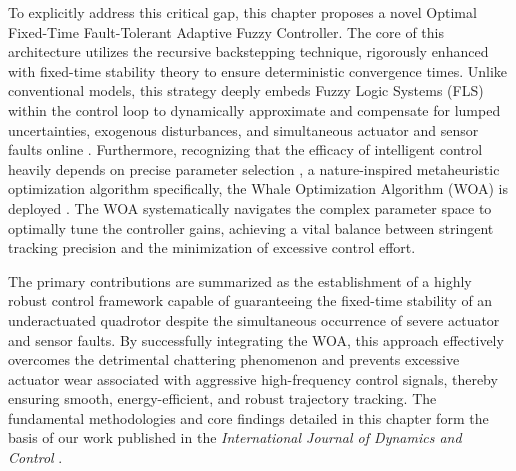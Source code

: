 To explicitly address this critical gap, this chapter proposes a novel Optimal Fixed-Time Fault-Tolerant Adaptive Fuzzy Controller. The core of this architecture utilizes the recursive backstepping technique, rigorously enhanced with fixed-time stability theory to ensure deterministic convergence times. Unlike conventional models, this strategy deeply embeds Fuzzy Logic Systems (FLS) within the control loop to dynamically approximate and compensate for lumped uncertainties, exogenous disturbances, and simultaneous actuator and sensor faults online \cite{Wang1994}. Furthermore, recognizing that the efficacy of intelligent control heavily depends on precise parameter selection \cite{MFC1, glida2019bat, glida2020pso}, a nature-inspired metaheuristic optimization algorithm specifically, the Whale Optimization Algorithm (WOA) is deployed \cite{woa}. The WOA systematically navigates the complex parameter space to optimally tune the controller gains, achieving a vital balance between stringent tracking precision and the minimization of excessive control effort.

The primary contributions are summarized as the establishment of a highly robust control framework capable of guaranteeing the  fixed-time stability of an underactuated quadrotor despite the simultaneous occurrence of severe actuator and sensor faults. By successfully integrating the WOA, this approach effectively overcomes the detrimental chattering phenomenon and prevents excessive actuator wear associated with aggressive high-frequency control signals, thereby ensuring smooth, energy-efficient, and robust trajectory tracking. The fundamental methodologies and core findings detailed in this chapter form the basis of our work published in the \textit{International Journal of Dynamics and Control} \cite{my2article}.


